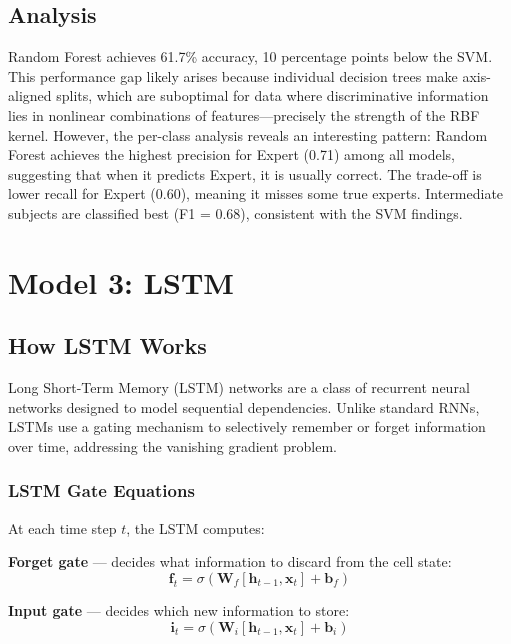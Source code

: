 \documentclass[12pt,a4paper]{article}
\begin{document}
\subsection{Analysis}

Random Forest achieves 61.7\% accuracy, 10 percentage points below the SVM. This performance gap likely arises because individual decision trees make axis-aligned splits, which are suboptimal for data where discriminative information lies in nonlinear combinations of features---precisely the strength of the RBF kernel. However, the per-class analysis reveals an interesting pattern: Random Forest achieves the highest precision for Expert (0.71) among all models, suggesting that when it predicts Expert, it is usually correct. The trade-off is lower recall for Expert (0.60), meaning it misses some true experts. Intermediate subjects are classified best (F1 = 0.68), consistent with the SVM findings.

\section{Model 3: LSTM}
\label{sec:lstm}

\subsection{How LSTM Works}

Long Short-Term Memory (LSTM) networks are a class of recurrent neural networks designed to model sequential dependencies. Unlike standard RNNs, LSTMs use a gating mechanism to selectively remember or forget information over time, addressing the vanishing gradient problem.

\subsubsection{LSTM Gate Equations}

At each time step $t$, the LSTM computes:

\textbf{Forget gate} --- decides what information to discard from the cell state:
\begin{equation}
\mathbf{f}_t = \sigma\left(\mathbf{W}_f [\mathbf{h}_{t-1}, \mathbf{x}_t] + \mathbf{b}_f\right)
\label{eq:forget}
\end{equation}

\textbf{Input gate} --- decides which new information to store:
\begin{equation}
\mathbf{i}_t = \sigma\left(\mathbf{W}_i [\mathbf{h}_{t-1}, \mathbf{x}_t] + \mathbf{b}_i\right)
\label{eq:input}
\end{equation}
\end{document}
